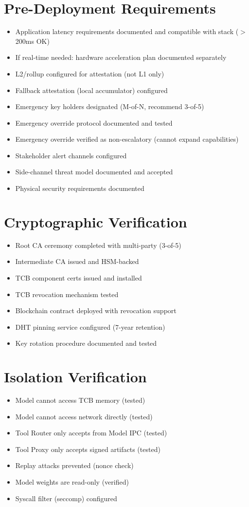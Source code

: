 \documentclass[11pt,letterpaper]{article}
\theoremstyle{definition}
\theoremstyle{remark}
\begin{document}
\section{Pre-Deployment Requirements}
\begin{itemize}
\item Application latency requirements documented and compatible with stack ($>$200ms OK)
\item If real-time needed: hardware acceleration plan documented separately
\item L2/rollup configured for attestation (not L1 only)
\item Fallback attestation (local accumulator) configured
\item Emergency key holders designated (M-of-N, recommend 3-of-5)
\item Emergency override protocol documented and tested
\item Emergency override verified as non-escalatory (cannot expand capabilities)
\item Stakeholder alert channels configured
\item Side-channel threat model documented and accepted
\item Physical security requirements documented
\end{itemize}

\section{Cryptographic Verification}
\begin{itemize}
\item Root CA ceremony completed with multi-party (3-of-5)
\item Intermediate CA issued and HSM-backed
\item TCB component certs issued and installed
\item TCB revocation mechanism tested
\item Blockchain contract deployed with revocation support
\item DHT pinning service configured (7-year retention)
\item Key rotation procedure documented and tested
\end{itemize}

\section{Isolation Verification}
\begin{itemize}
\item Model cannot access TCB memory (tested)
\item Model cannot access network directly (tested)
\item Tool Router only accepts from Model IPC (tested)
\item Tool Proxy only accepts signed artifacts (tested)
\item Replay attacks prevented (nonce check)
\item Model weights are read-only (verified)
\item Syscall filter (seccomp) configured
\end{itemize}
\end{document}
